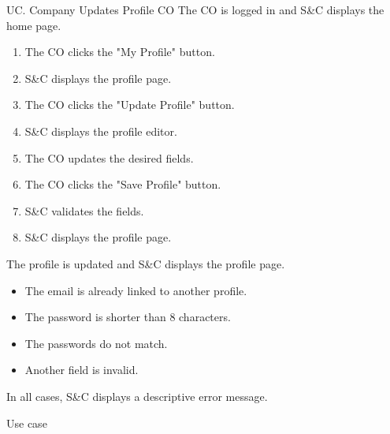 \begin{usecase}
    {UC\theuc. Company Updates Profile}
    {CO}
    {The CO is logged in and S\&C displays the home page.}
    {\begin{enumerate}[leftmargin=*]
        \item The CO clicks the "My Profile" button.
        \item S\&C displays the profile page.
        \item The CO clicks the "Update Profile" button.
        \item S\&C displays the profile editor.
        \item The CO updates the desired fields.
        \item The CO clicks the "Save Profile" button.
        \item S\&C validates the fields.
        \item S\&C displays the profile page.
    \end{enumerate}}
    {The profile is updated and S\&C displays the profile page.}
    {\begin{itemize}[leftmargin=*, label=\tiny\textbullet]
        \item The email is already linked to another profile.
        \item The password is shorter than 8 characters.
        \item The passwords do not match.
        \item Another field is invalid.
    \end{itemize}
    In all cases, S\&C displays a descriptive error message.}
    {Use case \theuc}
\end{usecase}

